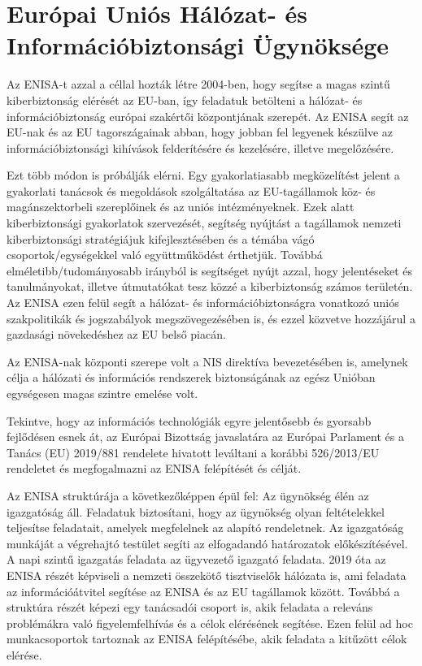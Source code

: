 \section{Európai Uniós Hálózat- és Információbiztonsági Ügynöksége}

Az ENISA-t azzal a céllal hozták létre 2004-ben, hogy segítse a magas szintű kiberbiztonság elérését az EU-ban, így feladatuk betölteni a hálózat- és információbiztonság európai szakértői központjának szerepét. Az ENISA segít az EU-nak és az EU tagországainak abban, hogy jobban fel legyenek készülve az információbiztonsági kihívások felderítésére és kezelésére, illetve megelőzésére.

Ezt több módon is próbálják elérni. Egy gyakorlatiasabb megközelítést jelent a gyakorlati tanácsok és megoldások szolgáltatása az EU-tagállamok köz- és magánszektorbeli szereplőinek és az uniós intézményeknek. Ezek alatt kiberbiztonsági gyakorlatok szervezését, segítség nyújtást a tagállamok nemzeti kiberbiztonsági stratégiájuk kifejlesztésében és a témába vágó csoportok/egységekkel való együttműködést érthetjük. Továbbá elméletibb/tudományosabb irányból is segítséget nyújt azzal, hogy jelentéseket és tanulmányokat, illetve útmutatókat tesz közzé a kiberbiztonság számos területén. Az ENISA ezen felül segít a hálózat- és információbiztonságra vonatkozó uniós szakpolitikák és jogszabályok megszövegezésében is, és ezzel közvetve hozzájárul a gazdasági növekedéshez az EU belső piacán.

Az ENISA-nak központi szerepe volt a NIS direktíva bevezetésében is, amelynek célja a hálózati és információs rendszerek biztonságának az egész Unióban egységesen magas szintre emelése volt. \cite{NIS-direktiva}

Tekintve, hogy az információs technológiák egyre jelentősebb és gyorsabb fejlődésen esnek át, az Európai Bizottság javaslatára az Európai Parlament és a Tanács (EU) 2019/881 rendelete \cite{2019/881} hivatott leváltani a korábbi 526/2013/EU rendeletet és megfogalmazni az ENISA felépítését és célját.

Az ENISA struktúrája a következőképpen épül fel: Az ügynökség élén az igazgatóság áll. Feladatuk biztosítani, hogy az ügynökség olyan feltételekkel teljesítse feladatait, amelyek megfelelnek az alapító rendeletnek. Az igazgatóság munkáját a végrehajtó testület segíti az elfogadandó határozatok előkészítésével. A napi szintű igazgatás feladata az ügyvezető igazgató feladata. 2019 óta az ENISA részét képviseli a nemzeti összekötő tisztviselők hálózata is, ami feladata az információátvitel segítése az ENISA és az EU tagállamok között. Továbbá a struktúra részét képezi egy tanácsadói csoport is, akik feladata a releváns problémákra való figyelemfelhívás és a célok elérésének segítése. Ezen felül ad hoc munkacsoportok tartoznak az ENISA felépítésébe, akik feladata a kitűzött célok elérése.


